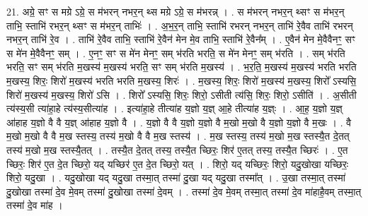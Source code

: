 \documentclass[17pt]{extarticle}
\begin{document}
21. अग्रे॒ सꣳ स मग्रे ऽग्रे॒ स म॑भरन् नभर॒न् थ्स मग्रे ऽग्रे॒ स म॑भरन्न् । . स म॑भरन् नभर॒न् थ्सꣳ स म॑भर॒न् ताभि॒ स्ताभि॑ रभर॒न् थ्सꣳ स म॑भर॒न् ताभिः॑ । . अ॒भ॒र॒न् ताभि॒ स्ताभि॑ रभरन् नभर॒न् ताभि॑ रे॒वैव ताभि॑ रभरन् नभर॒न् ताभि॑ रे॒व । . ताभि॑ रे॒वैव ताभि॒ स्ताभि॑ रे॒वैन॑ मेन मे॒व ताभि॒ स्ताभि॑ रे॒वैन᳚म् । . ए॒वैन॑ मेन मे॒वैवैनꣳ॒॒ सꣳ स मे॑न मे॒वैवैनꣳ॒॒ सम् । . ए॒नꣳ॒॒ सꣳ स मे॑न मेनꣳ॒॒ सम् भ॑रति भरति॒ स मे॑न मेनꣳ॒॒ सम् भ॑रति । . सम् भ॑रति भरति॒ सꣳ सम् भ॑रति म॒खस्य॑ म॒खस्य॑ भरति॒ सꣳ सम् भ॑रति म॒खस्य॑ । . भ॒र॒ति॒ म॒खस्य॑ म॒खस्य॑ भरति भरति म॒खस्य॒ शिरः॒ शिरो॑ म॒खस्य॑ भरति भरति म॒खस्य॒ शिरः॑ । . म॒खस्य॒ शिरः॒ शिरो॑ म॒खस्य॑ म॒खस्य॒ शिरो᳚ ऽस्यसि॒ शिरो॑ म॒खस्य॑ म॒खस्य॒ शिरो॑ ऽसि । . शिरो᳚ ऽस्यसि॒ शिरः॒ शिरो॒ ऽसीती त्य॑सि॒ शिरः॒ शिरो॒ ऽसीति॑ । . अ॒सीती त्य॑स्य॒सी त्या॑हा॒हे त्य॑स्य॒सीत्या॑ह । . इत्या॑हा॒हे तीत्या॑ह य॒ज्ञो य॒ज्ञ् आ॒हे तीत्या॑ह य॒ज्ञ्ः । . आ॒ह॒ य॒ज्ञो य॒ज्ञ् आ॑हाह य॒ज्ञो वै वै य॒ज्ञ् आ॑हाह य॒ज्ञो वै । . य॒ज्ञो वै वै य॒ज्ञो य॒ज्ञो वै म॒खो म॒खो वै य॒ज्ञो य॒ज्ञो वै म॒खः । . वै म॒खो म॒खो वै वै म॒ख स्तस्य॒ तस्य॑ म॒खो वै वै म॒ख स्तस्य॑ । . म॒ख स्तस्य॒ तस्य॑ म॒खो म॒ख स्तस्यै॒त दे॒तत् तस्य॑ म॒खो म॒ख स्तस्यै॒तत् । . तस्यै॒त दे॒तत् तस्य॒ तस्यै॒त च्छिरः॒ शिर॑ ए॒तत् तस्य॒ तस्यै॒त च्छिरः॑ । . ए॒त च्छिरः॒ शिर॑ ए॒त दे॒त च्छिरो॒ यद् यच्छिर॑ ए॒त दे॒त च्छिरो॒ यत् । . शिरो॒ यद् यच्छिरः॒ शिरो॒ यदु॒खोखा यच्छिरः॒ शिरो॒ यदु॒खा । . यदु॒खोखा यद् यदु॒खा तस्मा॒त् तस्मा॑ दु॒खा यद् यदु॒खा तस्मा᳚त् । . उ॒खा तस्मा॒त् तस्मा॑ दु॒खोखा तस्मा॑ दे॒व मे॒वम् तस्मा॑ दु॒खोखा तस्मा॑ दे॒वम् । . तस्मा॑ दे॒व मे॒वम् तस्मा॒त् तस्मा॑ दे॒व मा॑हाहै॒वम् तस्मा॒त् तस्मा॑ दे॒व मा॑ह । \newline
\end{document}
